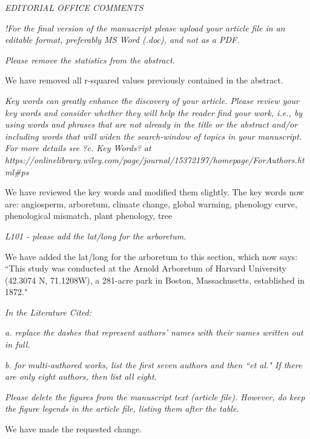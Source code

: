 \documentclass[10.95pt,a4paper]{letter}
\begin{document}
\par \emph{EDITORIAL OFFICE COMMENTS}

\par \emph{!For the final version of the manuscript please upload your article file in an editable format, preferably MS Word (.doc), and not as a PDF.}

\par \emph{Please remove the statistics from the abstract.}
\par We have removed all r-squared values previously contained in the abstract.

\par \emph{Key words can greatly enhance the discovery of your article. Please review your key words and consider whether they will help the reader find your work, i.e., by using words and phrases that are not already in the title or the abstract and/or including words that will widen the search-window of topics in your manuscript. For more details see ?c. Key Words? at https://onlinelibrary.wiley.com/page/journal/15372197/homepage/ForAuthors.html#ps} 
\par We have reviewed the key words and modified them slightly. The key words now are: angiosperm, arboretum, climate change, global warming, phenology curve, phenological mismatch, plant phenology, tree 
\par \emph{L101 - please add the lat/long for the arboretum.}
\par We have added the lat/long for the arboretum to this section, which now says: ``This study was conducted at the Arnold Arboretum of Harvard University (42.3074 \degree N, 71.1208\degree W), a 281-acre park in Boston, Massachusetts, established in 1872."

\par \emph{In the Literature Cited:}
\par \emph{a. replace the dashes that represent authors' names with their names written out in full.}

\par \emph{b. for multi-authored works, list the first seven authors and then ``et al." If there are only eight authors, then list all eight.}

\par \emph{Please delete the figures from the manuscript text (article file).  However, do keep the figure legends in the article file, listing them after the table.}  
\par We have made the requested change.
\end{document}
